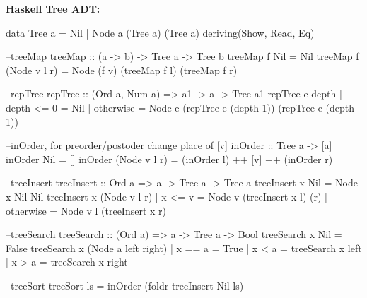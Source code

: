 \begin{breakbox}
\textbf{Haskell Tree ADT:}\\
\begin{haskellcode}
data Tree a = Nil | Node a (Tree a) (Tree a) 
			deriving(Show, Read, Eq)

--treeMap
treeMap :: (a -> b) -> Tree a -> Tree b
treeMap f Nil = Nil
treeMap f (Node v l r) = Node (f v) (treeMap f l) (treeMap f r)

--repTree
repTree :: (Ord a, Num a) => a1 -> a -> Tree a1
repTree e depth 
    | depth <= 0 = Nil
    | otherwise  = Node e (repTree e (depth-1)) 
    			(repTree e (depth-1))

--inOrder, for preorder/postoder change place of [v]
inOrder :: Tree a -> [a]
inOrder Nil = []
inOrder (Node v l r) = (inOrder l) ++ [v] ++ (inOrder r)

--treeInsert
treeInsert :: Ord a => a -> Tree a -> Tree a
treeInsert x Nil = Node x Nil Nil
treeInsert x (Node v l r) | x <= v = Node v (treeInsert x l) (r) 
                          | otherwise = Node v l (treeInsert x r)

--treeSearch                          
treeSearch :: (Ord a) => a -> Tree a -> Bool  
treeSearch x Nil = False  
treeSearch x (Node a left right)  
    | x == a = True  
    | x < a  = treeSearch x left  
    | x > a  = treeSearch x right

--treeSort
treeSort ls = inOrder (foldr treeInsert Nil ls)
\end{haskellcode}
\end{breakbox}
